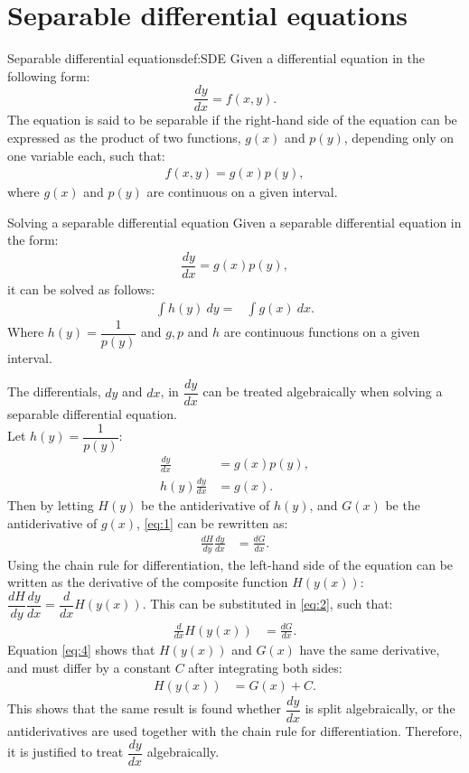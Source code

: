 \section{Separable differential equations}\label{SepDiff}
\begin{definition}{Separable differential equations}{def:SDE}
Given a differential equation in the following form: 
$$\frac{dy}{dx} = f(x,y).$$
The equation is said to be separable if the right-hand side of the equation can be expressed as the product of two functions, $g(x)$ and $p(y)$, depending only on one variable each, such that:
\begin{align*}
f(x,y)=g(x)p(y),
\end{align*}
where $g(x)$ and $p(y)$ are continuous on a given interval.
\end{definition}
\noindent
\begin{theorem}{Solving a separable differential equation}{}
Given a separable differential equation in the form:
\begin{align}
\dfrac{dy}{dx}=g(x)p(y), \label{SDEG}
\end{align}
it can be solved as follows:
\begin{align*}
\int h(y)\ dy =&\int g(x)\ dx.
\end{align*}
Where $h(y)=\dfrac{1}{p(y)}$ and $g, p$ and $h$ are continuous functions on a given interval.
\end{theorem}
\begin{justification}{}{}
The differentials, $dy$ and $dx$, in $\dfrac{dy}{dx}$ can be treated algebraically when solving a separable differential equation. 
\\
Let $h(y) = \dfrac{1}{p(y)}$:
 \begin{align}
	\frac{dy}{dx} &= g(x)p(y), \nonumber\\
	h(y)\frac{dy}{dx} &= g(x). \label{eq:1}
 \end{align}
Then by letting $H(y)$ be the antiderivative of $h(y)$, and $G(x)$ be the antiderivative of $g(x)$, \eqref{eq:1} can be rewritten as: 
 \begin{align}
 	\frac{dH}{dy}\frac{dy}{dx} &= \frac{dG}{dx}. \label{eq:2}
 \end{align}
Using the chain rule for differentiation, the left-hand side of the equation can be written as the derivative of the composite function $H \left(y(x) \right)$: $\dfrac{dH}{dy}\dfrac{dy}{dx} =\dfrac{d}{dx} H \left(y(x) \right).$ This can be substituted in \eqref{eq:2}, such that:
 \begin{align}
 	\frac{d}{dx}H\left(y(x)\right) &= \frac{dG}{dx}\label{eq:4}.
 \end{align}
Equation \eqref{eq:4} shows that $H\left(y(x)\right)$ and $G(x)$ have the same derivative, and must differ by a constant $C$ after integrating both sides:
 \begin{align*}
 	H\left(y(x)\right) &= G(x) + C.
 \end{align*}
This shows that the same result is found whether $\dfrac{dy}{dx}$ is split algebraically, or the antiderivatives are used together with the chain rule for differentiation. Therefore, it is justified to treat $\dfrac{dy}{dx}$ algebraically.
\end{justification}

